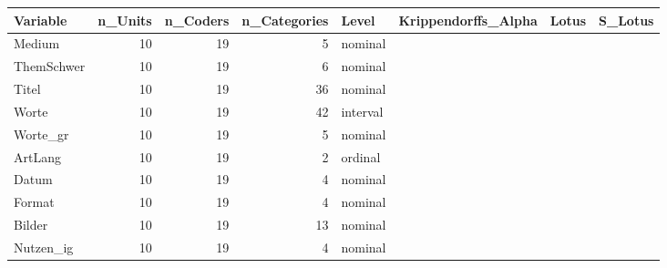 \documentclass[twoside, pagesize, fontsize=11pt, dvipsnames]{scrreport}
\begin{document}
\begin{table}
\centering
\begin{tabular}[t]{l|r|r|r|l|>{}r|>{}r|>{}r}
\hline
Variable & n\_Units & n\_Coders & n\_Categories & Level & Krippendorffs\_Alpha & Lotus & S\_Lotus\\
\hline
Medium & 10 & 19 & 5 & nominal & \cellcolor[HTML]{30123B}{\textcolor{white}{1.00}} & \cellcolor[HTML]{30123B}{\textcolor{white}{1.00}} & \cellcolor[HTML]{30123B}{\textcolor{white}{1.00}}\\
\hline
ThemSchwer & 10 & 19 & 6 & nominal & \cellcolor[HTML]{3AA3FC}{\textcolor{white}{0.79}} & \cellcolor[HTML]{3D9EFE}{\textcolor{white}{0.91}} & \cellcolor[HTML]{4294FF}{\textcolor{black}{0.89}}\\
\hline
Titel & 10 & 19 & 36 & nominal & \cellcolor[HTML]{2AEFA1}{\textcolor{black}{0.64}} & \cellcolor[HTML]{92FF47}{\textcolor{black}{0.79}} & \cellcolor[HTML]{27EEA4}{\textcolor{black}{0.79}}\\
\hline
Worte & 10 & 19 & 42 & interval & \cellcolor[HTML]{1CCDD8}{\textcolor{black}{0.72}} & \cellcolor[HTML]{AF1801}{\textcolor{white}{0.59}} & \cellcolor[HTML]{FE932A}{\textcolor{white}{0.58}}\\
\hline
Worte\_gr & 10 & 19 & 5 & nominal & \cellcolor[HTML]{35ABF8}{\textcolor{white}{0.78}} & \cellcolor[HTML]{448FFE}{\textcolor{white}{0.92}} & \cellcolor[HTML]{458AFC}{\textcolor{white}{0.90}}\\
\hline
ArtLang & 10 & 19 & 2 & ordinal & \cellcolor[HTML]{434EBA}{\textcolor{white}{0.92}} & \cellcolor[HTML]{3D358B}{\textcolor{white}{0.98}} & \cellcolor[HTML]{4146AC}{\textcolor{white}{0.96}}\\
\hline
Datum & 10 & 19 & 4 & nominal & \cellcolor[HTML]{1AE4B6}{\textcolor{black}{0.67}} & \cellcolor[HTML]{448FFE}{\textcolor{white}{0.92}} & \cellcolor[HTML]{4294FF}{\textcolor{black}{0.89}}\\
\hline
Format & 10 & 19 & 4 & nominal & \cellcolor[HTML]{467DF4}{\textcolor{white}{0.85}} & \cellcolor[HTML]{4454C3}{\textcolor{white}{0.96}} & \cellcolor[HTML]{4451BF}{\textcolor{white}{0.95}}\\
\hline
Bilder & 10 & 19 & 13 & nominal & \cellcolor[HTML]{28BCEB}{\textcolor{white}{0.75}} & \cellcolor[HTML]{1DE7B2}{\textcolor{black}{0.85}} & \cellcolor[HTML]{1FC9DD}{\textcolor{black}{0.84}}\\
\hline
Nutzen\_ig & 10 & 19 & 4 & nominal & \cellcolor[HTML]{F1CB3A}{\textcolor{black}{0.37}} & \cellcolor[HTML]{3CF58E}{\textcolor{black}{0.83}} & \cellcolor[HTML]{35F394}{\textcolor{black}{0.78}}\\

\end{tabular}
\end{table}
\end{document}
